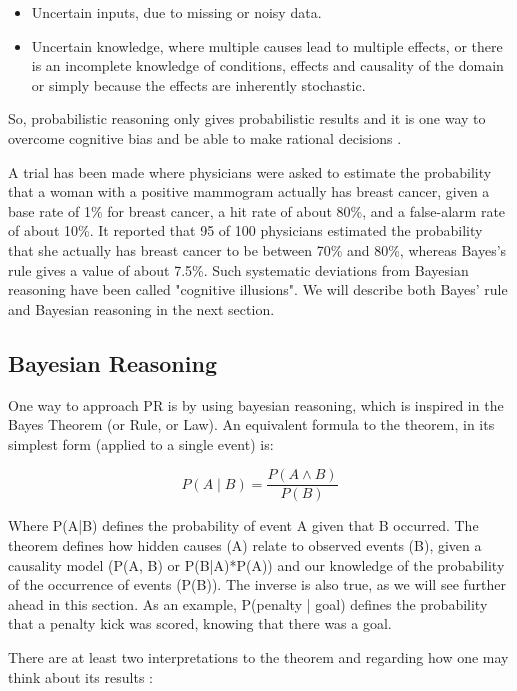 \begin{itemize}
  \item Uncertain inputs, due to missing or noisy data.
  \item Uncertain knowledge, where multiple causes lead to multiple effects,
  or there is an incomplete knowledge of conditions, effects and causality of the
  domain or simply because the effects are inherently stochastic.
\end{itemize}

So, probabilistic reasoning only gives probabilistic results and it is one way to
overcome cognitive bias and be able to make rational decisions \cite{Sedlmeier2001}.

A trial has been made \cite{christensen1982experience}
where physicians were asked to estimate the probability that a
woman with a positive mammogram actually has breast cancer, given a base rate of
1\% for breast cancer, a hit rate of about 80\%, and a false-alarm rate of about
10\%. It reported that 95 of 100 physicians estimated the probability that she
actually has breast cancer to be between 70\% and 80\%, whereas Bayes's rule
gives a value of about 7.5\%. Such systematic deviations from Bayesian reasoning
have been called "cognitive illusions". We will describe both Bayes' rule
and Bayesian reasoning in the next section.

\subsection{Bayesian Reasoning}
\label{sec:bayes}

One way to approach PR is by using bayesian reasoning, which is inspired in the
Bayes Theorem (or Rule, or Law). An equivalent formula to the theorem, in its
simplest form (applied to a single event) is:

$$ P(A \mid B) = \frac{P(A \land B)}{P(B)} $$

Where P(A|B) defines the probability of event A given that B occurred.
The theorem defines how hidden causes (A) relate to observed events (B), given
a causality model (P(A, B) or P(B|A)*P(A)) and our knowledge of the probability of the
occurrence of events (P(B)). The inverse is also true, as we will see further
ahead in this section.
As an example, P(penalty | goal) defines the probability that a penalty kick was
scored, knowing that there was a goal.

There are at least two interpretations to the theorem and regarding how one may think
about its results \cite{Fienberg2006}:

